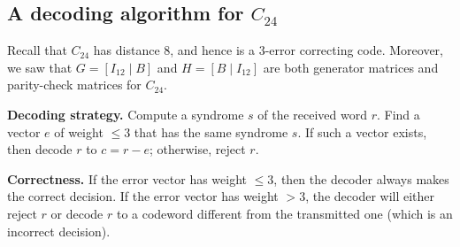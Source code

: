 \documentclass[10pt]{article}
\theoremstyle{newstyle}
\begin{document}
\subsection{A decoding algorithm for $C_{24}$}

Recall that $C_{24}$ has distance $8$, and hence is a $3$-error correcting code. Moreover, we 
saw that $G = [I_{12} \mid B]$ and $H = [B \mid I_{12}]$ are both generator matrices and 
parity-check matrices for $C_{24}$. 

{\bf Decoding strategy.} Compute a syndrome $s$ of the received word $r$. Find a vector 
$e$ of weight $\leq 3$ that has the same syndrome $s$. If such a vector exists, then decode
$r$ to $c = r-e$; otherwise, reject $r$. 

{\bf Correctness.} If the error vector has weight $\leq 3$, then the decoder always makes the 
correct decision. If the error vector has weight $>3$, the decoder will either reject $r$ 
or decode $r$ to a codeword different from the transmitted one (which is an incorrect decision). 
\end{document}
